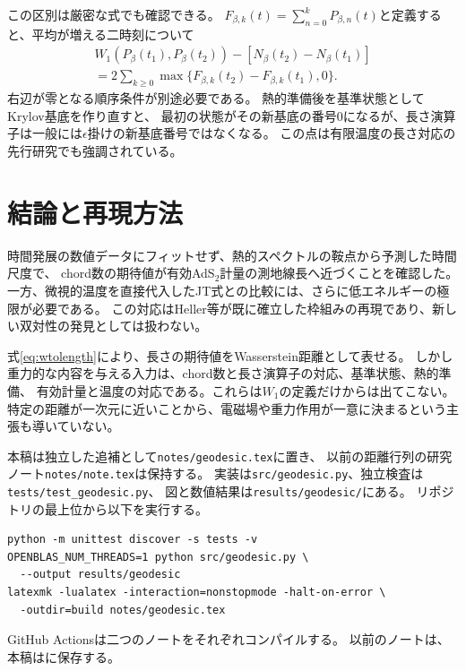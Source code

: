 \documentclass[a4paper,11pt]{ltjsarticle}
\numberwithin{equation}{section}
\begin{document}
この区別は厳密な式でも確認できる。
$F_{\beta,k}(t)=\sum_{n=0}^kP_{\beta,n}(t)$と定義すると、平均が増える二時刻について
\begin{multline}
 W_1(P_\beta(t_1),P_\beta(t_2))-[N_\beta(t_2)-N_\beta(t_1)]\\
 =2\sum_{k\geq0}\max\{F_{\beta,k}(t_2)-F_{\beta,k}(t_1),0\}.
\end{multline}
右辺が零となる順序条件が別途必要である。
熱的準備後を基準状態としてKrylov基底を作り直すと、
最初の状態がその新基底の番号0になるが、長さ演算子は一般には$\epsilon$掛けの新基底番号ではなくなる。
この点は有限温度の長さ対応の先行研究でも強調されている\cite{Heller}。

\section{結論と再現方法}
時間発展の数値データにフィットせず、熱的スペクトルの鞍点から予測した時間尺度で、
chord数の期待値が有効AdS$_2$計量の測地線長へ近づくことを確認した。
一方、微視的温度を直接代入したJT式との比較には、さらに低エネルギーの極限が必要である。
この対応はHeller等が既に確立した枠組みの再現であり、新しい双対性の発見としては扱わない。

式\eqref{eq:wtolength}により、長さの期待値をWasserstein距離として表せる。
しかし重力的な内容を与える入力は、chord数と長さ演算子の対応、基準状態、熱的準備、
有効計量と温度の対応である。これらは$W_1$の定義だけからは出てこない。
特定の距離が一次元に近いことから、電磁場や重力作用が一意に決まるという主張も導いていない。

本稿は独立した追補として\texttt{notes/geodesic.tex}に置き、
以前の距離行列の研究ノート\texttt{notes/note.tex}は保持する。
実装は\texttt{src/geodesic.py}、独立検査は\texttt{tests/test\_geodesic.py}、
図と数値結果は\texttt{results/geodesic/}にある。
リポジトリの最上位から以下を実行する。
\begin{verbatim}
python -m unittest discover -s tests -v
OPENBLAS_NUM_THREADS=1 python src/geodesic.py \
  --output results/geodesic
latexmk -lualatex -interaction=nonstopmode -halt-on-error \
  -outdir=build notes/geodesic.tex
\end{verbatim}
GitHub Actionsは二つのノートをそれぞれコンパイルする。
以前のノートは、本稿はに保存する。
\end{document}
